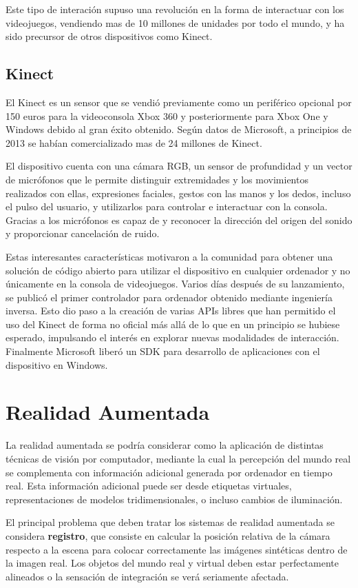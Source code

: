 Este tipo de interación supuso una revolución en la forma de interactuar con los videojuegos, vendiendo mas de 10 millones de unidades por todo el mundo, y ha sido precursor de otros dispositivos como Kinect.

\subsection{Kinect}
El Kinect es un sensor que se vendió previamente como un periférico opcional por 150 euros para la videoconsola Xbox 360 y posteriormente para Xbox One y Windows debido al gran éxito obtenido. Según datos de Microsoft, a principios de 2013 se habían comercializado mas de 24 millones de Kinect. 

El dispositivo cuenta con una cámara RGB, un sensor de profundidad y un vector de micrófonos que le permite distinguir extremidades y los movimientos realizados con ellas, expresiones faciales, gestos con las manos y los dedos, incluso el pulso del usuario, y utilizarlos para controlar e interactuar con la consola. Gracias a los micrófonos es capaz de y reconocer la dirección del origen del sonido y proporcionar cancelación de ruido.

Estas interesantes características motivaron a la comunidad para obtener una solución de código abierto para utilizar el dispositivo en cualquier ordenador y no únicamente en la consola de videojuegos. Varios días después de su lanzamiento, se publicó el primer controlador para ordenador obtenido mediante ingeniería inversa. Esto dio paso a la creación de varias APIs libres que han permitido el uso del Kinect de forma no oficial más allá de lo que en un principio se hubiese esperado, impulsando el interés en explorar nuevas modalidades de interacción. Finalmente Microsoft liberó un SDK para desarrollo de aplicaciones con el dispositivo en Windows.  

\section{Realidad Aumentada}
La realidad aumentada se podría considerar como la aplicación de distintas técnicas de visión por computador, mediante la cual la percepción del mundo real se complementa con información adicional generada por ordenador en tiempo real. Esta información adicional puede ser desde etiquetas virtuales, representaciones de modelos tridimensionales, o incluso cambios de iluminación. 

El principal problema que deben tratar los sistemas de realidad aumentada se considera \textbf{registro}, que consiste en calcular la posición relativa de la cámara respecto a la escena para colocar correctamente las imágenes sintéticas dentro de la imagen real. Los objetos del mundo real y virtual deben estar perfectamente alineados o la sensación de integración se verá seriamente afectada.

